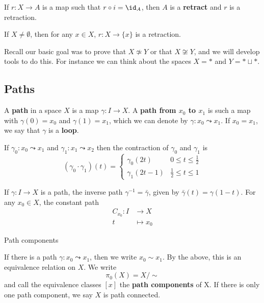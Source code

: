 \documentclass{article}
\numberwithin{nthm}{subsection}
\begin{document}
\begin{ndef}
    If $r: X \to A$ is a map such that $ r \circ i = \id_A$, then $A$ is a \textbf{retract} and $r$ is a retraction.
\end{ndef}

\begin{eg}
    If $X \neq \emptyset$, then for any $x \in X$, $r: X \to \{x\}$ is a retraction.
\end{eg}

Recall our basic goal was to prove that $X \not\simeq Y$ or that $X \not \cong Y$, and we will develop tools to do this.  For instance we can think about the spaces $X = *$ and $Y = * \sqcup *$.

\subsection{Paths}

\begin{ndef}
    A \textbf{path} in a space $X$ is a map $\gamma: I \to X$.
    A \textbf{path from $x_0$ to $x_1$} is such a map with $\gamma(0) = x_0$ and $\gamma(1) = x_1$, which we can denote by $\gamma: x_0 \leadsto x_1$.
    If $x_0 = x_1$, we say that $\gamma$ is a \textbf{loop}.
\end{ndef}

If $\gamma_0: x_0 \leadsto x_1$ and $\gamma_1: x_1 \leadsto x_2$ then the contraction of $\gamma_0$ and $\gamma_1$ is
\begin{equation*}
    (\gamma_0 \cdot \gamma_1) (t) =
    \begin{cases}
        \gamma_0(2t) & 0 \leq t \leq \frac12 \\
        \gamma_1(2t-1) & \frac12 \leq t \leq 1
    \end{cases}
\end{equation*}

If $\gamma: I \to X$ is a path, the inverse path $\gamma^{-1} = \bar{\gamma}$, given by $\bar{\gamma}(t) = \gamma(1-t)$.
For any $x_0 \in X$, the constant path
\begin{align*}
    C_{x_0}: I &\to X \\
             t &\mapsto x_0
\end{align*}

\begin{ndef}\hypertarget{def:pathComp}{Path components}
    If there is a path $\gamma:x_0 \leadsto x_1$, then we write $x_0 \sim x_1$.  By the above, this is an equivalence relation on $X$.  We write
    \begin{equation*}
        \pi_0(X) = X/\sim
    \end{equation*}
    and call the equivalence classes $[x]$ the \textbf{path components} of X.
    If there is only one path component, we say $X$ is path connected.
\end{ndef}
\end{document}
